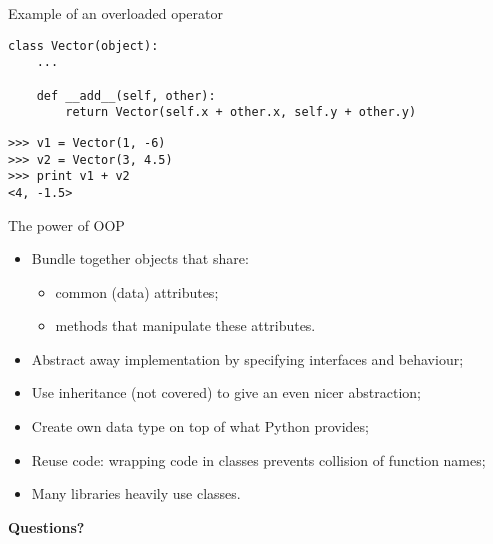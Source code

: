 \documentclass{beamer}
\begin{document}
\begin{frame}[fragile]{Example of an overloaded operator}
\begin{verbatim}
class Vector(object):
    ...

    def __add__(self, other):
        return Vector(self.x + other.x, self.y + other.y)
\end{verbatim}

\bigskip

\begin{verbatim}
>>> v1 = Vector(1, -6)
>>> v2 = Vector(3, 4.5)
>>> print v1 + v2
<4, -1.5>
\end{verbatim}
\end{frame}

\begin{frame}{The power of OOP}
\begin{itemize}
\item \textcolor{pms280_compl}{Bundle} together objects that share:
\begin{itemize}
\item common (data) attributes;
\item methods that manipulate these attributes.
\end{itemize}

\item \textcolor{pms280_compl}{Abstract away} implementation by
specifying interfaces and behaviour;

\item Use \textcolor{pms280_compl}{inheritance} (not covered) to give an
even nicer abstraction;

\item \textcolor{pms280_compl}{Create} own data type on top of what
Python provides;

\item \textcolor{pms280_compl}{Reuse} code: wrapping code in classes
prevents collision of function names;

\item Many \textcolor{pms280_compl}{libraries} heavily use classes.
\end{itemize}

\vfill

\begin{center}
\textcolor{pms280}{\Large \textbf{Questions?}}
\end{center}
\end{frame}
\end{document}
